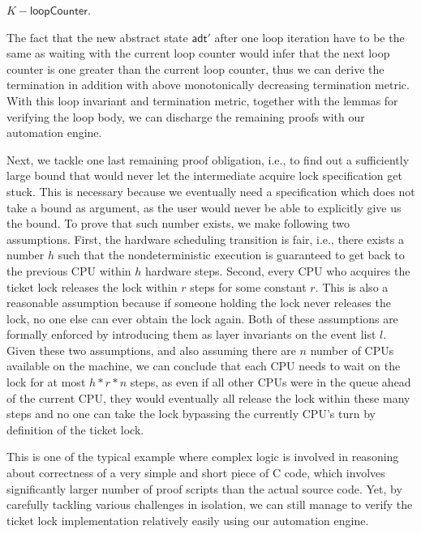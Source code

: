 \begin{definition} $K - \textsf{loopCounter}$.
\end{definition}

The fact that the new abstract state $\textsf{adt}'$ after one loop iteration have to be the same as
waiting with the current loop counter would infer that the next loop counter is one greater than the current
loop counter, thus we can derive the termination in addition with above monotonically decreasing termination
metric.
With this loop invariant and termination metric, together with the lemmas for verifying the loop body,
we can discharge the remaining proofs with our automation engine. 

Next, we tackle one last remaining proof obligation, i.e., to find out a sufficiently large bound
that would never let the intermediate acquire lock specification get stuck.
This is necessary because we eventually need a specification which does not take a bound
as argument, as the user would never be able to explicitly give us the bound.
To prove that such number exists, we make following two assumptions. 
First, the hardware scheduling transition
is fair, i.e., there exists a number $h$ such that the nondeterministic execution is
guaranteed to get back to the previous CPU within $h$ hardware steps.
Second, every CPU who acquires the ticket lock releases the lock within
$r$ steps for some constant $r$. This is also a reasonable assumption because if someone
holding the lock never releases the lock, no one else can ever obtain the lock
again. Both of these assumptions are formally enforced by introducing
them as layer invariants on the event list $l$.
Given these two assumptions, and also assuming there are $n$ number
of CPUs available on the machine, we can conclude that each CPU
needs to wait on the lock for at most $h * r * n$ steps, as even if all
other CPUs were in the queue ahead of the current CPU, they would eventually
all release the lock within these many steps and no one can take the lock
bypassing the currently CPU's turn by definition of the ticket lock.

This is one of the typical example where complex logic is involved in reasoning about correctness
of a very simple and short piece of C code, which involves significantly larger number of proof
scripts than the actual source code. Yet, by carefully tackling various challenges in isolation, we
can still manage to verify the ticket lock implementation relatively easily using our automation engine.

